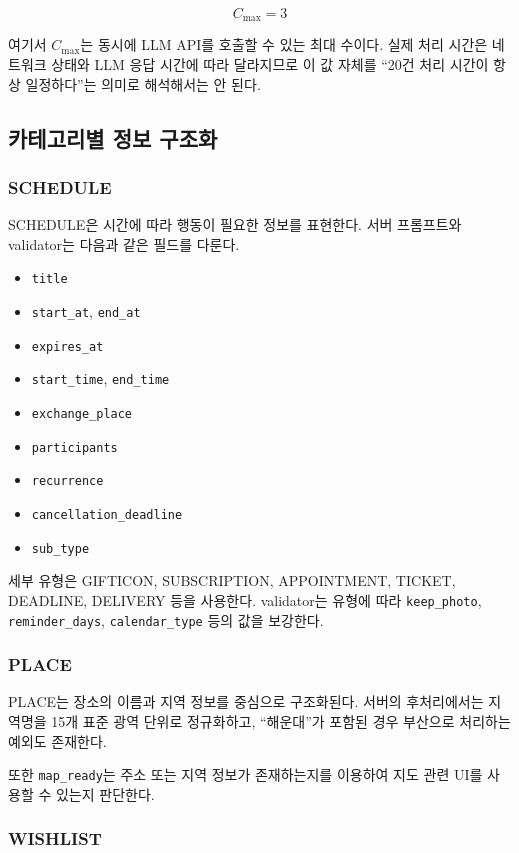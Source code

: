 \documentclass[11pt,a4paper]{article}
\begin{document}
\[
C_{\max}=3
\]

여기서 $C_{\max}$는 동시에 LLM API를 호출할 수 있는 최대 수이다. 실제 처리 시간은 네트워크 상태와 LLM 응답 시간에 따라 달라지므로 이 값 자체를 ``20건 처리 시간이 항상 일정하다''는 의미로 해석해서는 안 된다.

\subsection{카테고리별 정보 구조화}

\subsubsection{SCHEDULE}

SCHEDULE은 시간에 따라 행동이 필요한 정보를 표현한다. 서버 프롬프트와 validator는 다음과 같은 필드를 다룬다.

\begin{itemize}
    \item \texttt{title}
    \item \texttt{start\_at}, \texttt{end\_at}
    \item \texttt{expires\_at}
    \item \texttt{start\_time}, \texttt{end\_time}
    \item \texttt{exchange\_place}
    \item \texttt{participants}
    \item \texttt{recurrence}
    \item \texttt{cancellation\_deadline}
    \item \texttt{sub\_type}
\end{itemize}

세부 유형은 GIFTICON, SUBSCRIPTION, APPOINTMENT, TICKET, DEADLINE, DELIVERY 등을 사용한다. validator는 유형에 따라 \texttt{keep\_photo}, \texttt{reminder\_days}, \texttt{calendar\_type} 등의 값을 보강한다.

\subsubsection{PLACE}

PLACE는 장소의 이름과 지역 정보를 중심으로 구조화된다. 서버의 후처리에서는 지역명을 15개 표준 광역 단위로 정규화하고, ``해운대''가 포함된 경우 부산으로 처리하는 예외도 존재한다.

또한 \texttt{map\_ready}는 주소 또는 지역 정보가 존재하는지를 이용하여 지도 관련 UI를 사용할 수 있는지 판단한다.

\subsubsection{WISHLIST}
\end{document}
